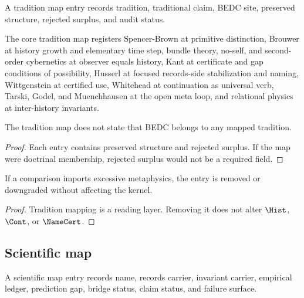 \begin{definition}
\label{def:philosophy-package-tradition-map-entry}
A tradition map entry records tradition, traditional claim, BEDC site,
preserved structure, rejected surplus, and audit status.
\end{definition}

\begin{definition}
\label{def:philosophy-core-tradition-map}
The core tradition map registers Spencer-Brown at primitive
distinction, Brouwer at history growth and elementary time step,
bundle theory, no-self, and second-order cybernetics at observer equals
history, Kant at certificate and gap conditions of possibility,
Husserl at focused records-side stabilization and naming,
Wittgenstein at certified use, Whitehead at continuation as universal
verb, Tarski, Godel, and Muenchhausen at the open meta loop, and
relational physics at inter-history invariants.
\end{definition}

\begin{theorem}
\label{thm:philosophy-tradition-map-not-membership}
The tradition map does not state that BEDC belongs to any mapped
tradition.
\end{theorem}
\begin{proof}
Each entry contains preserved structure and rejected surplus. If the
map were doctrinal membership, rejected surplus would not be a required
field.
\end{proof}

\begin{corollary}
\label{cor:philosophy-tradition-comparisons-retractable}
If a comparison imports excessive metaphysics, the entry is removed or
downgraded without affecting the kernel.
\end{corollary}
\begin{proof}
Tradition mapping is a reading layer. Removing it does not alter
\(\Hist\), \(\Cont\), or \(\NameCert\).
\end{proof}

\subsection{Scientific map}
\label{subsec:philosophy-package-scientific-map}

\begin{definition}
\label{def:philosophy-scientific-map-entry}
A scientific map entry records name, records carrier, invariant
carrier, empirical ledger, prediction gap, bridge status, claim
status, and failure surface.
\end{definition}

